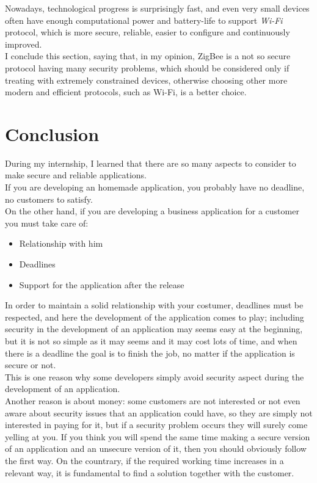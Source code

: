\documentclass[12pt]{report}
\begin{document}
{Nowadays, technological progress is surprisingly fast, and even very small devices often have enough computational power and battery-life to support \emph{Wi-Fi} protocol, which is more secure, reliable, easier to configure and continuously improved.\\
I conclude this section, saying that, in my opinion, ZigBee is a not so secure protocol having many security problems, which should be considered only if treating with extremely constrained devices, otherwise choosing other more modern and efficient protocols, such as Wi-Fi, is a better choice.\\

\chapter{Conclusion}
During my internship, I learned that there are so many aspects to consider to make secure and reliable applications.\\
If you are developing an homemade application, you probably have no deadline, no customers to satisfy.\\
On the other hand, if you are developing a business application for a customer you must take care of:
\begin{itemize}
  \item Relationship with him
  \item Deadlines
  \item Support for the application after the release
\end{itemize}

In order to maintain a solid relationship with your costumer, deadlines must be respected, and here the development of the application comes to play; including security in the development of an application may seems easy at the beginning, but it is not so simple as it may seems and it may cost lots of time, and when there is a deadline the goal is to finish the job, no matter if the application is secure or not.\\
This is one reason why some developers simply avoid security aspect during the development of an application.\\

Another reason is about money: some customers are not interested or not even aware about security issues that an application could have, so they are simply not interested in paying for it, but if a security problem occurs they will surely come yelling at you.\newline
If you think you will spend the same time making a secure version of an application and an unsecure version of it, then you should obviously follow the first way. On the countrary, if the required working time increases in a relevant way, it is fundamental to find a solution together with the customer.\\ 

}
\end{document}
